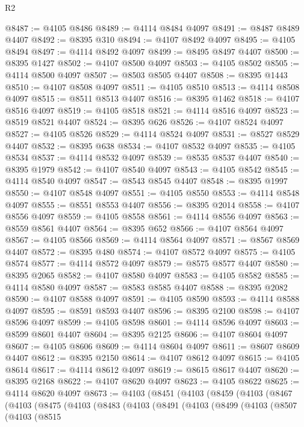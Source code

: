 \begin{lexlean}{R2}
\begin{coremodule}
@8487 := @4105 @8486
@8489 := @4114 @8484 @4097
@8491 := @8487 @8489 @4407
@8492 := @8395 @310
@8494 := @4107 @8492 @4097
@8495 := @4105 @8494
@8497 := @4114 @8492 @4097
@8499 := @8495 @8497 @4407
@8500 := @8395 @1427
@8502 := @4107 @8500 @4097
@8503 := @4105 @8502
@8505 := @4114 @8500 @4097
@8507 := @8503 @8505 @4407
@8508 := @8395 @1443
@8510 := @4107 @8508 @4097
@8511 := @4105 @8510
@8513 := @4114 @8508 @4097
@8515 := @8511 @8513 @4407
@8516 := @8395 @1462
@8518 := @4107 @8516 @4097
@8519 := @4105 @8518
@8521 := @4114 @8516 @4097
@8523 := @8519 @8521 @4407
@8524 := @8395 @626
@8526 := @4107 @8524 @4097
@8527 := @4105 @8526
@8529 := @4114 @8524 @4097
@8531 := @8527 @8529 @4407
@8532 := @8395 @638
@8534 := @4107 @8532 @4097
@8535 := @4105 @8534
@8537 := @4114 @8532 @4097
@8539 := @8535 @8537 @4407
@8540 := @8395 @1979
@8542 := @4107 @8540 @4097
@8543 := @4105 @8542
@8545 := @4114 @8540 @4097
@8547 := @8543 @8545 @4407
@8548 := @8395 @1997
@8550 := @4107 @8548 @4097
@8551 := @4105 @8550
@8553 := @4114 @8548 @4097
@8555 := @8551 @8553 @4407
@8556 := @8395 @2014
@8558 := @4107 @8556 @4097
@8559 := @4105 @8558
@8561 := @4114 @8556 @4097
@8563 := @8559 @8561 @4407
@8564 := @8395 @652
@8566 := @4107 @8564 @4097
@8567 := @4105 @8566
@8569 := @4114 @8564 @4097
@8571 := @8567 @8569 @4407
@8572 := @8395 @480
@8574 := @4107 @8572 @4097
@8575 := @4105 @8574
@8577 := @4114 @8572 @4097
@8579 := @8575 @8577 @4407
@8580 := @8395 @2065
@8582 := @4107 @8580 @4097
@8583 := @4105 @8582
@8585 := @4114 @8580 @4097
@8587 := @8583 @8585 @4407
@8588 := @8395 @2082
@8590 := @4107 @8588 @4097
@8591 := @4105 @8590
@8593 := @4114 @8588 @4097
@8595 := @8591 @8593 @4407
@8596 := @8395 @2100
@8598 := @4107 @8596 @4097
@8599 := @4105 @8598
@8601 := @4114 @8596 @4097
@8603 := @8599 @8601 @4407
@8604 := @8395 @2125
@8606 := @4107 @8604 @4097
@8607 := @4105 @8606
@8609 := @4114 @8604 @4097
@8611 := @8607 @8609 @4407
@8612 := @8395 @2150
@8614 := @4107 @8612 @4097
@8615 := @4105 @8614
@8617 := @4114 @8612 @4097
@8619 := @8615 @8617 @4407
@8620 := @8395 @2168
@8622 := @4107 @8620 @4097
@8623 := @4105 @8622
@8625 := @4114 @8620 @4097
@8673 := @4103
    (@8451
      (@4103
        (@8459
          (@4103
            (@8467
              (@4103
                (@8475
                  (@4103
                    (@8483
                      (@4103
                        (@8491
                          (@4103
                            (@8499
                              (@4103
                                (@8507
                                  (@4103
                                    (@8515

\end{coremodule}
\end{lexlean}
